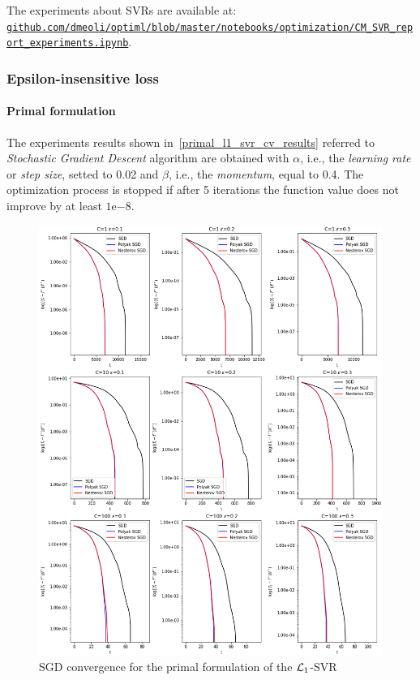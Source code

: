 The experiments about SVRs are available at: \\ \href{https://github.com/dmeoli/optiml/blob/master/notebooks/optimization/CM_SVR_report_experiments.ipynb}{\texttt{github.com/dmeoli/optiml/blob/master/notebooks/optimization/CM\_SVR\_report\_experiments.ipynb}}.

\subsubsection{Epsilon-insensitive loss}

\paragraph{Primal formulation}

The experiments results shown in~\ref{primal_l1_svr_cv_results} referred to \emph{Stochastic Gradient Descent} algorithm are obtained with $\alpha$, i.e., the \emph{learning rate} or \emph{step size}, setted to 0.02 and $\beta$, i.e., the \emph{momentum}, equal to 0.4. The optimization process is stopped if after 5 iterations the function value does not improve by at least $1\mathrm{e}{-8}$.



\begin{figure}[H]
	\centering
	\includegraphics[scale=0.5]{img/l1_svr_loss_history}
	\caption{SGD convergence for the primal formulation of the $\protect \mathcal{L}_1$-SVR}
	\label{fig:l1_svr_loss_history}
\end{figure}

